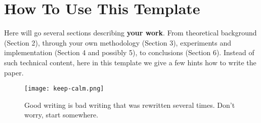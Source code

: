 \documentclass{ExcelAtFIT}
\begin{document}
\section{How To Use This Template}
\label{sec:HowToUse}

Here will go several sections describing \textbf{your work}. From theoretical background (Section 2), through your own methodology (Section 3), experiments and implementation (Section 4 and possibly 5), to conclusions (Section 6). Instead of such technical content, here in this template we give a few hints how to write the paper.

\begin{figure}[t]
	\centering
	\texttt{[image: keep-calm.png]}
	\caption{Good writing is bad writing that was rewritten several times.  Don't worry, start somewhere.}
	\label{fig:KeepCalm}
\end{figure}
\end{document}
